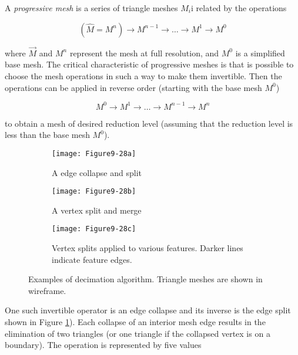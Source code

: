 \begin{description}[leftmargin=0cm,labelindent=0cm]
A \emph{progressive mesh} is a series of triangle meshes $M_i$i related by the operations

\begin{equation}\label{eq:9.14}
\left(\hat{M} = M^n \right) \to M^{n - 1} \to \ldots \to M^1 \to M^0
\end{equation}

where $\vec{M}$ and $M^n$ represent the mesh at full resolution, and $M^0$ is a simplified base mesh. The critical characteristic of progressive meshes is that is possible to choose the mesh operations in such a way to make them invertible. Then the operations can be applied in reverse order (starting with the base mesh $M^0$)

\begin{equation}\label{eq:9.15}
M^0 \to M^1 \to \ldots \to M^{n - 1} \to M^n
\end{equation}

to obtain a mesh of desired reduction level (assuming that the reduction level is less than the base mesh $M^0$).

\begin{figure}[htb]
    \centering
	\begin{subfigure}[h]{0.96\linewidth}
		\texttt{[image: Figure9-28a]}
		\captionsetup{justification=centering}
		\caption{A edge collapse and split}
		\label{fig:Figure9-28a}
	\end{subfigure}
	\hfill
	\begin{subfigure}[h]{0.96\linewidth}
		\texttt{[image: Figure9-28b]}
		\captionsetup{justification=centering}
		\caption{A vertex split and merge}
		\label{fig:Figure9-28b}
	\end{subfigure}
	\hfill
	\begin{subfigure}[h]{0.96\linewidth}
		\texttt{[image: Figure9-28c]}
		\captionsetup{justification=centering}
        \caption{Vertex splits applied to various features. Darker lines indicate feature edges.}
		\label{fig:Figure9-28c}
	\end{subfigure}
	\caption{Examples of decimation algorithm. Triangle meshes are shown in wireframe.}\label{fig:Figure9-28}
\end{figure}

One such invertible operator is an edge collapse and its inverse is the edge split shown in Figure \ref{fig:Figure9-28a}). Each collapse of an interior mesh edge results in the elimination of two triangles (or one triangle if the collapsed vertex is on a boundary). The operation is represented by five values


\end{description}
